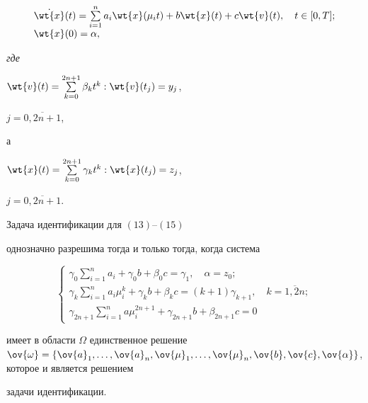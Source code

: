 \begin{equation}


\begin{array}{l}


\Dot{\wt{x}}(t)=\sum\limits^n_{i=1}a_i\wt{x}(\mu_i t) +


b\wt{x}(t) + c\wt{v}(t), \quad t\in[0,T];\\


\wt{x}(0)=\alpha,


\end{array}


\end{equation}


{\it где}


$\wt{v}(t)=\sum\limits^{2n+1}_{k=0}\beta_k t^k:\wt{v}(t_j) = y_j$,


$j=\overline{0,2n+1}$,


а


$\wt{x}(t)=\sum\limits^{2n+1}_{k=0}\gamma_k t^k: \wt{x}(t_j)=z_j$,


$j=\overline{0,2n+1}$.





\begin{thm}


Задача идентификации для $(13)$--$(15)$


однозначно разрешима тогда и только тогда, когда система


\begin{equation}


\begin{cases}


\gamma_0\sum\limits^n_{i=1}a_i +


\gamma_0 b + \beta_0 c =


\gamma_1, \quad \alpha=z_0; \\


\gamma_k\sum\limits^n_{i=1}a_i\mu^k_i + \gamma_k b + \beta_k c =


(k+1)\gamma_{k+1}, \quad k= \overline{1,2n}; \\


\gamma_{2n+1}\sum\limits^n_{i=1}a\mu^{2n+1}_i + \gamma_{2n+1}b +


\beta_{2n+1}c = 0


\end{cases}


\end{equation}


имеет в области $\Omega$ единственное решение $\ov{\omega} =


\{\ov{a}_1,\dotsc,\ov{a}_n, \ov{\mu}_1, \dotsc, \ov{\mu}_n,


\ov{b},\ov{c},\ov{\alpha}\}$, которое и является решением


задачи идентификации.


\end{thm}





